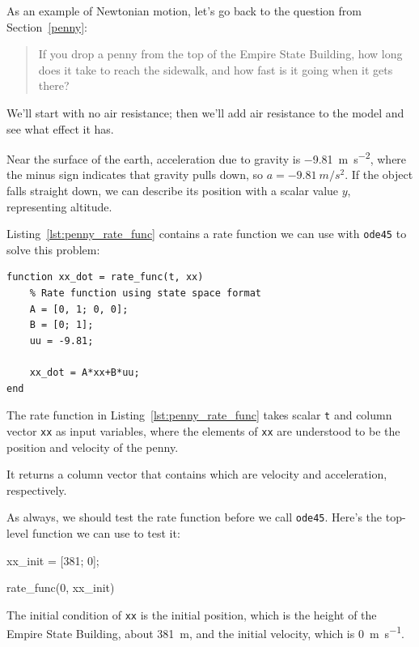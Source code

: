 \documentclass[../../book.tex]{subfiles}
\begin{document}
As an example of Newtonian motion, let's go back to the question from Section~\ref{penny}:

\begin{quote}
If you drop a penny from the top of the Empire State Building, how long does it take to reach the sidewalk, and how fast is it going when it gets there?
\end{quote}

We'll start with no air resistance; then we'll add air resistance to the model and see what effect it has.


Near the surface of the earth,
acceleration due to gravity is \SI{-9.81}{\meter \per \second \squared}, where the minus sign
indicates that gravity pulls down, so $a=\SI{-9.81}{m/s^2}$.
If the object falls straight down, we can describe its position with a
scalar value $y$, representing altitude.

Listing~\ref{lst:penny_rate_func} contains a rate function we can use with \lstinline{ode45} to solve
this problem:

\begin{lstlisting}[caption={A rate function for the falling penny problem}, label={lst:penny_rate_func}]
function xx_dot = rate_func(t, xx)
    % Rate function using state space format
    A = [0, 1; 0, 0];
    B = [0; 1];
    uu = -9.81;
    
    xx_dot = A*xx+B*uu;
end
\end{lstlisting}

The rate function in Listing~\ref{lst:penny_rate_func} takes scalar \lstinline{t} and column vector \lstinline{xx} as input variables, where the elements of \lstinline{xx} are understood to be the position and velocity of the penny.

It returns a column vector that contains which are velocity and acceleration, respectively.

As always, we should test the rate function before we call \lstinline{ode45}.  Here's the top-level function we can use to test it:

\begin{code}
xx_init = [381; 0];

rate_func(0, xx_init)
\end{code}

The initial condition of \lstinline{xx} is the initial position, which is the height of the Empire State Building, about \SI{381}{\meter}, and the initial velocity, which is \SI{0}{\meter \per \second}.
\end{document}
